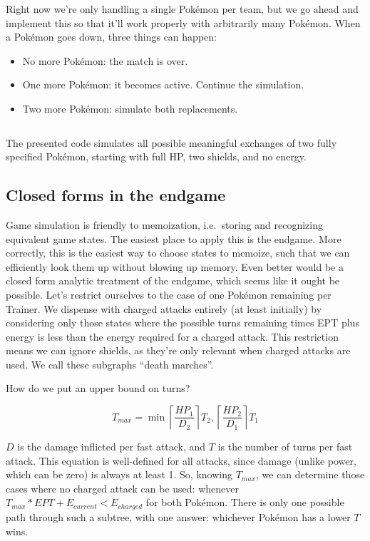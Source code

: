 Right now we're only handling a single Pokémon per team, but we
 go ahead and implement this so that it'll work properly
 with arbitrarily many Pokémon.
When a Pokémon goes down, three things can happen:
\begin{itemize}
  \item No more Pokémon: the match is over.
  \item One more Pokémon: it becomes active. Continue the simulation.
  \item Two more Pokémon: simulate both replacements.
\end{itemize}
\inputminted{cpp}{s/ko.h}
The presented code simulates all possible meaningful exchanges of two fully specified Pokémon, starting
  with full HP, two shields, and no energy.



\subsection{Closed forms in the endgame\label{subsec:endgame}}
Game simulation is friendly to memoization, i.e.\ storing and recognizing equivalent game states.
The easiest place to apply this is the endgame.
More correctly, this is the easiest way to choose states to memoize,
  such that we can efficiently look them up without blowing up memory.
Even better would be a closed form analytic treatment of the endgame,
  which seems like it ought be possible.
Let's restrict ourselves to the case of one Pokémon remaining per Trainer.
We dispense with charged attacks entirely (at least initially) by considering
  only those states where the possible turns remaining times EPT plus
  energy is less than the energy required for a charged attack.
This restriction means we can ignore shields, as they're only relevant
  when charged attacks are used.
We call these subgraphs ``death marches''.

How do we put an upper bound on turns?

\[ T_{max} = \min \left\lceil\frac{HP_1}{D_2}\right\rceil T_2,\left\lceil\frac{HP_2}{D_1}\right\rceil T_1 \]

$D$ is the damage inflicted per fast attack, and $T$ is the number of turns per fast attack.
This equation is well-defined for all attacks, since damage (unlike power,
  which can be zero) is always at least 1.
So, knowing $T_{max}$, we can determine those cases where no charged attack
  can be used: whenever $T_{max} * EPT + E_{current} < E_{charged}$ for both Pokémon.
There is only one possible path through such a subtree, with one answer:
  whichever Pokémon has a lower $T$ wins.

